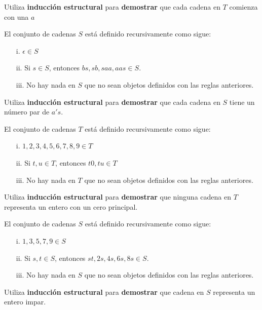 \documentclass[oneside]{style}
\begin{document}
\begin{questions}[label=\protect\circled{\bfseries\arabic*}]
{        Utiliza \textbf{inducción estructural} para \textbf{demostrar} que 
        cada cadena en $T$ comienza con una $a$
    }

    \question
    {
        El conjunto de cadenas $S$ está definido recursivamente como sigue: 
        \begin{itemize}
            \item [i.] $\epsilon \in S$
            \item [ii.] Si $s \in S$, entonces $bs, sb, saa, aas \in S$.
            \item [iii.] No hay nada en $S$ que no sean objetos definidos con 
            las reglas anteriores.  
        \end{itemize}

        Utiliza \textbf{inducción estructural} para \textbf{demostrar} que 
        cada cadena en $S$ tiene un número par de $a's$.
    }

    \question
    {
        El conjunto de cadenas $T$ está definido recursivamente como sigue:
        \begin{itemize}
            \item [i.] $1,2,3,4,5,6,7,8,9 \in T$
            \item [ii.] Si $t, u \in T$, entonces $t0, tu \in T$
            \item [iii.] No hay nada en $T$ que no sean objetos definidos con 
            las reglas anteriores.  
        \end{itemize}

        Utiliza \textbf{inducción estructural} para \textbf{demostrar} que 
        ninguna cadena en $T$ representa un entero con un cero principal. 
    }

    \question
    {
        El conjunto de cadenas $S$ está definido recursivamente como sigue: 
        \begin{itemize}
            \item [i.] $1,3,5,7,9 \in S$
            \item [ii.] Si $s,t \in S$, entonces $st, 2s, 4s, 6s, 8s \in S$.
            \item [iii.] No hay nada en $S$ que no sean objetos definidos con 
            las reglas anteriores.  
        \end{itemize}

        Utiliza \textbf{inducción estructural} para \textbf{demostrar} que 
        cadena en $S$ representa un entero impar. 
    }


\end{questions}
\end{document}
